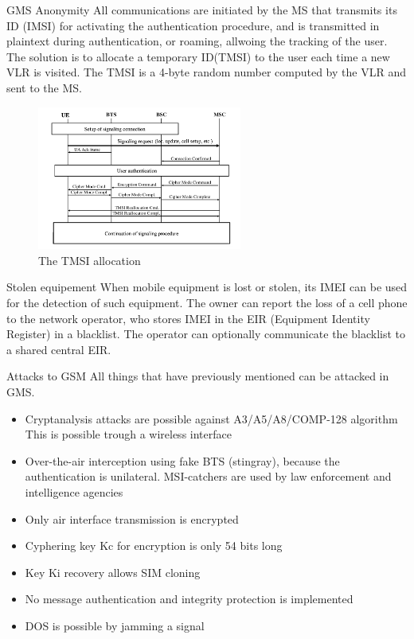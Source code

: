   \begin{section}{GMS Anonymity}
    All communications are initiated by the MS that transmits its ID (IMSI) for activating the
    authentication procedure, and is transmitted in plaintext during authentication, or roaming,
    allwoing the tracking of the user. The solution is to allocate a temporary ID(TMSI) to the user
    each time a new VLR is visited. The TMSI is a 4-byte random number computed by the VLR and sent
    to the MS.

    \begin{figure}[h]
      \centering
      \includegraphics[width=0.6\textwidth]{img/wireless/tmsi.png}
      \caption{The TMSI allocation}
    \end{figure}

    \begin{subsection}{Stolen equipement}
      When mobile equipment is lost or stolen, its IMEI can be used for the detection of such
      equipment. The owner can report the loss of a cell phone to the network operator, who stores
      IMEI in the EIR (Equipment Identity Register) in a blacklist. The operator can optionally
      communicate the blacklist to a shared central EIR.
    \end{subsection}
  \end{section}

  \begin{section}{Attacks to GSM}
    All things that have previously mentioned can be attacked in GMS.
    \begin{itemize}
      \item Cryptanalysis attacks are possible against A3/A5/A8/COMP-128 algorithm
        \subitem This is possible trough a wireless interface
      \item Over-the-air interception using fake BTS (stingray), because the authentication is
        unilateral. MSI-catchers are used by law enforcement and intelligence agencies
      \item Only air interface transmission is encrypted
      \item Cyphering key Kc for encryption is only 54 bits long
      \item Key Ki recovery allows SIM cloning
      \item No message authentication and integrity protection is implemented
      \item DOS is possible by jamming a signal
    \end{itemize}
  \end{section}

